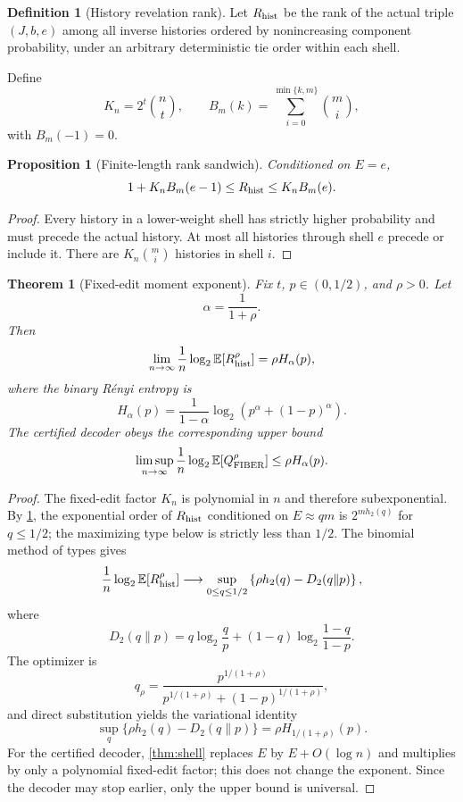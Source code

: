 \documentclass[11pt]{article}
\newtheorem{theorem}{Theorem}
\newtheorem{proposition}{Proposition}
\theoremstyle{definition}
\newtheorem{definition}{Definition}
\theoremstyle{remark}
\newcommand{\Qfib}{Q_{\rm FIBER}}
\newcommand{\Rhist}{R_{\rm hist}}
\newcommand{\Dkl}{D_2}
\newcommand{\hbin}{h_2}
\newcommand{\Renyi}{H}
\begin{document}
\begin{definition}[History revelation rank]
Let $\Rhist$ be the rank of the actual triple $(J,b,e)$ among all inverse histories ordered by nonincreasing component probability, under an arbitrary deterministic tie order within each shell.
\end{definition}
Define
\[
K_n=2^t\binom nt,\qquad B_m(k)=\sum_{i=0}^{\min\{k,m\}}\binom mi,
\]
with $B_m(-1)=0$.

\begin{proposition}[Finite-length rank sandwich]
\label{prop:ranksandwich}
Conditioned on $E=e$,
\begin{equation}
1+K_nB_m(e-1)\le \Rhist\le K_nB_m(e).
\label{eq:ranksandwich}
\end{equation}
\end{proposition}
\begin{proof}
Every history in a lower-weight shell has strictly higher probability and must precede the actual history.  At most all histories through shell $e$ precede or include it.  There are $K_n\binom mi$ histories in shell $i$.
\end{proof}

\begin{theorem}[Fixed-edit moment exponent]
\label{thm:moment}
Fix $t$, $p\in(0,1/2)$, and $\rho>0$.  Let
\[
\alpha=\frac1{1+\rho}.
\]
Then
\begin{equation}
\lim_{n\to\infty}\frac1n\log_2\mathbb E[\Rhist^\rho]
=\rho\Renyi_\alpha(p),
\label{eq:moment}
\end{equation}
where the binary R\'enyi entropy is
\[
\Renyi_\alpha(p)=\frac1{1-\alpha}\log_2\left(p^\alpha+(1-p)^\alpha\right).
\]
The certified decoder obeys the corresponding upper bound
\begin{equation}
\limsup_{n\to\infty}\frac1n\log_2\mathbb E[\Qfib^\rho]
\le \rho\Renyi_\alpha(p).
\label{eq:certmoment}
\end{equation}
\end{theorem}
\begin{proof}
The fixed-edit factor $K_n$ is polynomial in $n$ and therefore subexponential.  By \cref{prop:ranksandwich}, the exponential order of $\Rhist$ conditioned on $E\approx qm$ is $2^{m\hbin(q)}$ for $q\le1/2$; the maximizing type below is strictly less than $1/2$.  The binomial method of types gives
\[
\frac1n\log_2\mathbb E[\Rhist^\rho]
\longrightarrow
\sup_{0\le q\le1/2}\left\{\rho\hbin(q)-\Dkl(q\|p)\right\},
\]
where
\[
\Dkl(q\|p)=q\log_2\frac qp+(1-q)\log_2\frac{1-q}{1-p}.
\]
The optimizer is
\[
q_\rho=\frac{p^{1/(1+\rho)}}{p^{1/(1+\rho)}+(1-p)^{1/(1+\rho)}},
\]
and direct substitution yields the variational identity
\[
\sup_q\{\rho\hbin(q)-\Dkl(q\|p)\}
=\rho\Renyi_{1/(1+\rho)}(p).
\]
For the certified decoder, \cref{thm:shell} replaces $E$ by $E+O(\log n)$ and multiplies by only a polynomial fixed-edit factor; this does not change the exponent.  Since the decoder may stop earlier, only the upper bound is universal.
\end{proof}
\end{document}
